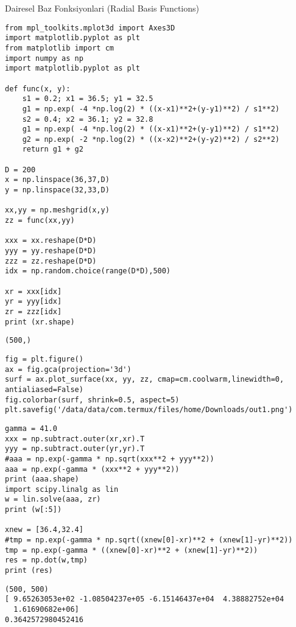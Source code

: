\documentclass[12pt,fleqn]{article}\usepackage{../../common}
\begin{document}
Dairesel Baz Fonksiyonlari (Radial Basis Functions)

\begin{verbatim}
from mpl_toolkits.mplot3d import Axes3D
import matplotlib.pyplot as plt
from matplotlib import cm
import numpy as np
import matplotlib.pyplot as plt

def func(x, y):
    s1 = 0.2; x1 = 36.5; y1 = 32.5
    g1 = np.exp( -4 *np.log(2) * ((x-x1)**2+(y-y1)**2) / s1**2)
    s2 = 0.4; x2 = 36.1; y2 = 32.8
    g1 = np.exp( -4 *np.log(2) * ((x-x1)**2+(y-y1)**2) / s1**2)
    g2 = np.exp( -2 *np.log(2) * ((x-x2)**2+(y-y2)**2) / s2**2)
    return g1 + g2

D = 200
x = np.linspace(36,37,D)
y = np.linspace(32,33,D)

xx,yy = np.meshgrid(x,y)
zz = func(xx,yy)

xxx = xx.reshape(D*D)
yyy = yy.reshape(D*D)
zzz = zz.reshape(D*D)
idx = np.random.choice(range(D*D),500)

xr = xxx[idx]
yr = yyy[idx]
zr = zzz[idx]
print (xr.shape)
\end{verbatim}

\begin{verbatim}
(500,)
\end{verbatim}

\begin{verbatim}
fig = plt.figure()
ax = fig.gca(projection='3d')
surf = ax.plot_surface(xx, yy, zz, cmap=cm.coolwarm,linewidth=0, antialiased=False)
fig.colorbar(surf, shrink=0.5, aspect=5)
plt.savefig('/data/data/com.termux/files/home/Downloads/out1.png')
\end{verbatim}

\begin{verbatim}
gamma = 41.0
xxx = np.subtract.outer(xr,xr).T
yyy = np.subtract.outer(yr,yr).T
#aaa = np.exp(-gamma * np.sqrt(xxx**2 + yyy**2))
aaa = np.exp(-gamma * (xxx**2 + yyy**2))
print (aaa.shape)
import scipy.linalg as lin
w = lin.solve(aaa, zr)
print (w[:5])

xnew = [36.4,32.4]
#tmp = np.exp(-gamma * np.sqrt((xnew[0]-xr)**2 + (xnew[1]-yr)**2))
tmp = np.exp(-gamma * ((xnew[0]-xr)**2 + (xnew[1]-yr)**2))
res = np.dot(w,tmp)
print (res)
\end{verbatim}

\begin{verbatim}
(500, 500)
[ 9.65263053e+02 -1.08504237e+05 -6.15146437e+04  4.38882752e+04
  1.61690682e+06]
0.3642572980452416
\end{verbatim}
\end{document}
